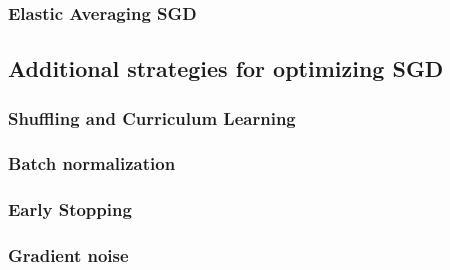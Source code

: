 \documentclass[10pt,a4paper]{ctexbook}
\begin{document}
\subsubsection{Elastic Averaging SGD}

\subsection{Additional strategies for optimizing SGD}
\subsubsection{Shuffling and Curriculum Learning}
\subsubsection{Batch normalization}
\subsubsection{Early Stopping}
\subsubsection{Gradient noise}

\ifx\mlbook\undefined
    
\end{document}
